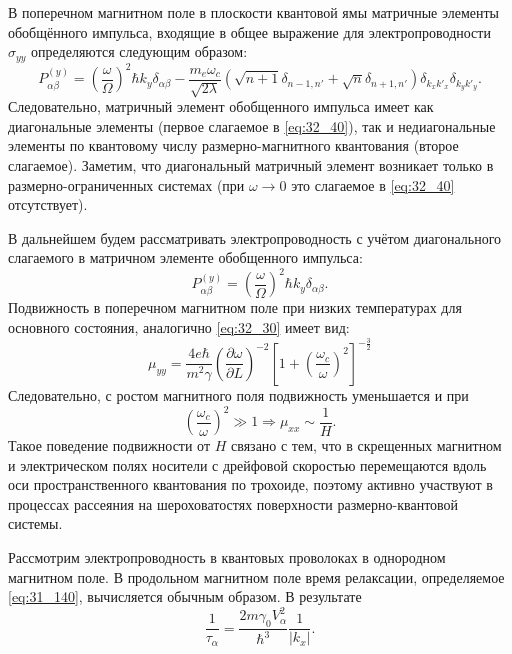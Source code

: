 В поперечном магнитном поле в плоскости квантовой ямы матричные элементы обобщённого импульса, входящие в общее выражение для электропроводности $\sigma_{yy}$ определяются следующим образом:
\begin{equation} \label{eq:32_40}
P^{(y)}_{\alpha\beta} = {\left(\frac{\omega}{\Omega}\right)}^2 \hbar k_y \delta_{\alpha\beta} - \frac{m_e \omega_c}{\sqrt{2\lambda}} \left(\sqrt{n+1} \delta_{n-1,n'} + \sqrt{n} \delta_{n+1,n'} \right) \delta_{k_x k'_x} \delta_{k_y k'_y}.
\end{equation}
Следовательно, матричный элемент обобщенного импульса имеет как диагональные элементы (первое слагаемое в \eqref{eq:32_40}), так и недиагональные элементы по квантовому числу размерно-магнитного квантования (второе слагаемое). Заметим, что диагональный матричный элемент возникает только в размерно-ограниченных системах (при $\omega \to 0$ это слагаемое в \eqref{eq:32_40} отсутствует).

В дальнейшем будем рассматривать электропроводность с учётом диагонального слагаемого в матричном элементе обобщенного импульса:
\begin{equation} \label{eq:32_45}
P^{(y)}_{\alpha\beta} = {\left(\frac{\omega}{\Omega}\right)}^2 \hbar k_y \delta_{\alpha\beta}.
\end{equation}
Подвижность в поперечном магнитном поле при низких температурах для основного состояния, аналогично \eqref{eq:32_30} имеет вид:
\begin{equation} \label{eq:32_50}
\mu_{yy} =\frac{4e\hbar }{m^{2} \gamma } \left(\frac{\partial \omega }{\partial L} \right)^{-2} \left[1+\left(\frac{\omega _{c} }{\omega } \right)^{2} \right]^{-\frac{3}{2} }
\end{equation}
Следовательно, с ростом магнитного поля подвижность уменьшается и при
\[
\left(\frac{\omega_c}{\omega } \right)^2 \gg 1 \Rightarrow \mu_{xx} \sim \frac{1}{H} .
\]
Такое поведение подвижности от $H$ связано с тем, что в скрещенных магнитном и электрическом полях носители с дрейфовой скоростью перемещаются вдоль оси пространственного квантования по трохоиде, поэтому активно участвуют в процессах рассеяния на шероховатостях поверхности размерно-квантовой системы. 

Рассмотрим электропроводность в квантовых проволоках в однородном магнитном поле. В продольном магнитном поле время релаксации, определяемое \eqref{eq:31_140}, вычисляется обычным образом. В результате
\begin{equation} \label{eq:32_60}
\frac{1}{\tau_{\alpha } } = \frac{2m \gamma_0 V_{\alpha }^2  }{\hbar^3 } \frac{1}{\left|k_x \right|} . 
\end{equation}

